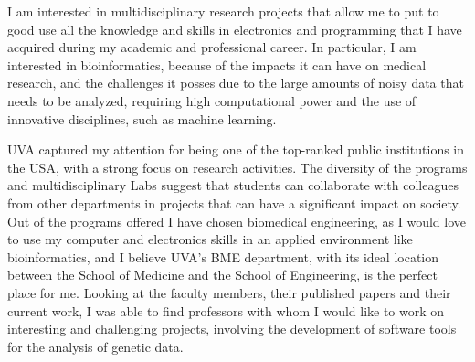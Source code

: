 \begin{cvletter}




I am interested in multidisciplinary research projects that allow me to put to good use all the knowledge and skills in electronics and programming that I have acquired  during my academic and professional career. In particular, I am interested in bioinformatics, because of the impacts it can have on medical research, and the challenges it posses due to the large amounts of noisy data that needs to be analyzed, requiring high computational power and the use of innovative disciplines, such as machine learning.







UVA captured my attention for being one of the top-ranked public institutions in the USA, with a strong focus on research activities. The diversity of the programs and multidisciplinary Labs suggest that students can collaborate with colleagues from other departments in projects that can have a significant impact on society.
Out of the programs offered I have chosen biomedical engineering, as I would love to use my computer and electronics skills in an applied environment like bioinformatics, and I believe UVA's BME department, with its ideal location between the School of Medicine and the School of Engineering, is the perfect place for me. Looking at the faculty members, their published papers and their current work, I was able to find professors with whom I would like to work on interesting and challenging projects, involving the development of software tools for the analysis of genetic data.




\end{cvletter}


\makeletterclosing


